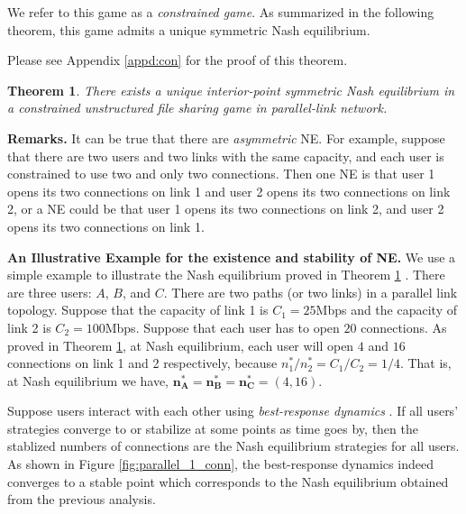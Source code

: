 \documentclass[conference]{IEEEtran}
\newtheorem{theorem}{Theorem}
\begin{document}
We refer to this game as a \textit{constrained game}. As
summarized in the following theorem, this game admits a unique
symmetric Nash equilibrium.

Please see Appendix \ref{appd:con} for the proof of this theorem.

\begin{theorem}
There exists a unique interior-point symmetric Nash equilibrium in
a constrained unstructured file sharing game in parallel-link
network. \label{them:con}
\end{theorem}

\bigskip
\noindent \textbf{Remarks.} It can be true that there are
\textit{asymmetric} NE. For example, suppose that there are two
users and two links with the same capacity, and each user is
constrained to use two and only two connections. Then one NE is
that user 1 opens its two connections on link 1 and user 2 opens
its two connections on link 2, or a NE could be that user 1 opens
its two connections on link 2, and user 2 opens its two
connections on link 1.

\bigskip
\noindent \textbf{An Illustrative Example for the existence and
stability of NE.} We use a simple example to illustrate the Nash
equilibrium proved in Theorem \ref{them:con} . There are three
users: $A$, $B$, and $C$. There are two paths (or two links) in a
parallel link topology. Suppose that the capacity of link 1 is
$C_1=25$Mbps and the capacity of link 2 is $C_2=100$Mbps. Suppose
that each user has to open $20$ connections. As proved in Theorem
\ref{them:con}, at Nash equilibrium, each user will open $4$ and
$16$ connections on link 1 and 2 respectively, because
$n^*_1/n^*_2=C_1/C_2=1/4$. That is, at Nash equilibrium we have, $
\mathbf{n^*_A}=\mathbf{n^*_B}=\mathbf{n^*_C}=(4,16). $

Suppose users interact with each other using \textit{best-response
dynamics} \cite{basar98game}\cite{zhang05tcpgame_icnp}. If all
users' strategies converge to or stabilize at some points as time
goes by, then the stablized numbers of connections are the Nash
equilibrium strategies for all users. As shown in Figure
\ref{fig:parallel_1_conn}, the best-response dynamics indeed
converges to a stable point which corresponds to the Nash
equilibrium obtained from the previous analysis.
\end{document}
